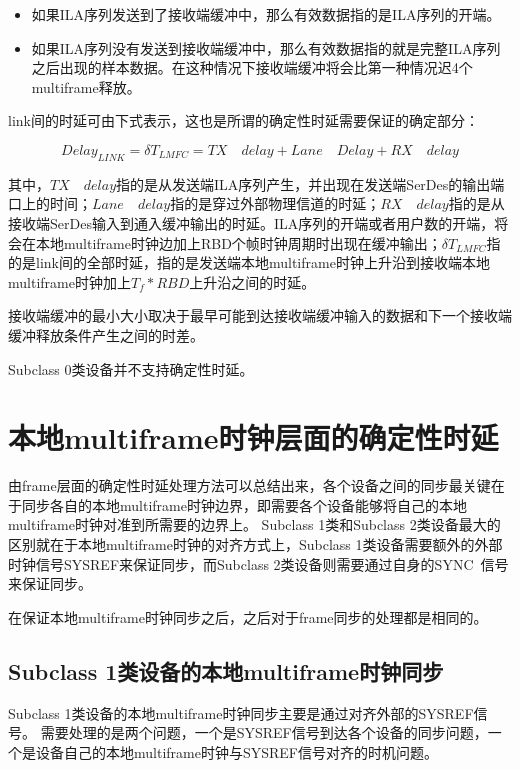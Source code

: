 \documentclass[UTF8]{ctexart}
\begin{document}
\begin{itemize}
\item 如果ILA序列发送到了接收端缓冲中，那么有效数据指的是ILA序列的开端。
\item 如果ILA序列没有发送到接收端缓冲中，那么有效数据指的就是完整ILA序列之后出现的样本数据。在这种情况下接收端缓冲将会比第一种情况迟4个multiframe释放。
\end{itemize}

link间的时延可由下式表示，这也是所谓的确定性时延需要保证的确定部分：

$$Delay_{LINK} = \delta T_{LMFC} = TX \quad delay + Lane \quad Delay + RX \quad delay$$

其中，$TX \quad delay$指的是从发送端ILA序列产生，并出现在发送端SerDes的输出端口上的时间；$Lane \quad delay$指的是穿过外部物理信道的时延；$RX \quad delay$指的是从接收端SerDes输入到通入缓冲输出的时延。ILA序列的开端或者用户数的开端，将会在本地multiframe时钟边加上RBD个帧时钟周期时出现在缓冲输出；$\delta T_{LMFC}$指的是link间的全部时延，指的是发送端本地multiframe时钟上升沿到接收端本地multiframe时钟加上$T_f * RBD$上升沿之间的时延。

接收端缓冲的最小大小取决于最早可能到达接收端缓冲输入的数据和下一个接收端缓冲释放条件产生之间的时差。

Subclass 0类设备并不支持确定性时延。

\section{本地multiframe时钟层面的确定性时延}

由frame层面的确定性时延处理方法可以总结出来，各个设备之间的同步最关键在于同步各自的本地multiframe时钟边界，即需要各个设备能够将自己的本地multiframe时钟对准到所需要的边界上。
Subclass 1类和Subclass 2类设备最大的区别就在于本地multiframe时钟的对齐方式上，Subclass 1类设备需要额外的外部时钟信号SYSREF来保证同步，而Subclass 2类设备则需要通过自身的SYNC~信号来保证同步。

在保证本地multiframe时钟同步之后，之后对于frame同步的处理都是相同的。

\subsection{Subclass 1类设备的本地multiframe时钟同步}

Subclass 1类设备的本地multiframe时钟同步主要是通过对齐外部的SYSREF信号。
需要处理的是两个问题，一个是SYSREF信号到达各个设备的同步问题，一个是设备自己的本地multiframe时钟与SYSREF信号对齐的时机问题。
\end{document}
